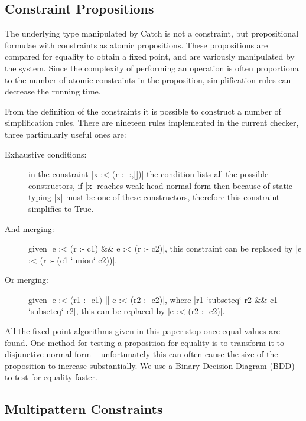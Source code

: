 \documentclass[preprint]{sigplanconf}
\begin{document}
\subsection{Constraint Propositions}

The underlying type manipulated by Catch is not a constraint, but propositional formulae with constraints as atomic propositions. These propositions are compared for equality to obtain a fixed point, and are variously manipulated by the system. Since the complexity of performing an operation is often proportional to the number of atomic constraints in the proposition, simplification rules can decrease the running time.

From the definition of the constraints it is possible to construct a number of simplification rules. There are nineteen rules implemented in the current checker, three particularly useful ones are:

\begin{description}
\item[Exhaustive conditions:] in the constraint |x :< (r :- {:,[]})| the condition lists all the possible constructors, if |x| reaches weak head normal form then because of static typing |x| must be one of these constructors, therefore this constraint simplifies to True.

\item[And merging:] given |e :< (r :- c1) && e :< (r :- c2)|, this constraint can be replaced by |e :< (r :- (c1 `union` c2))|.

\item[Or merging:] given |e :< (r1 :- c1) || e :< (r2 :- c2)|, where |r1 `subseteq` r2 && c1 `subseteq` r2|, this can be replaced by |e :< (r2 :- c2)|.
\end{description}

All the fixed point algorithms given in this paper stop once equal values are found. One method for testing a proposition for equality is to transform it to disjunctive normal form -- unfortunately this can often cause the size of the proposition to increase substantially. We use a Binary Decision Diagram (BDD) \citep{lee:bdd} to test for equality faster.

\subsection{Multipattern Constraints}
\label{sec:multipattern}
\end{document}
